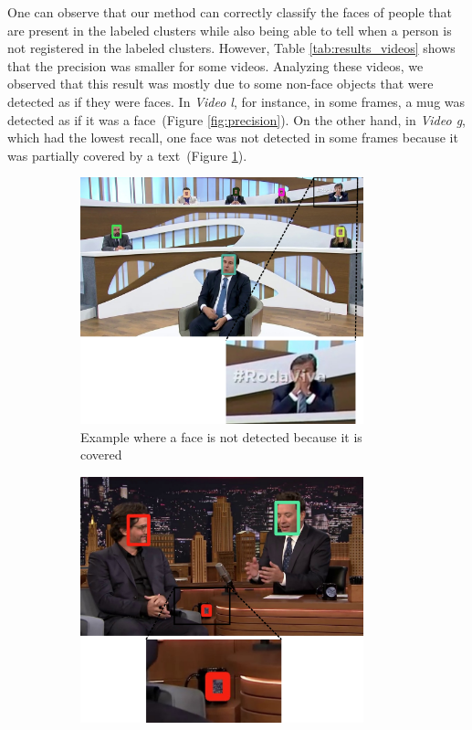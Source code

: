One can observe that our method can correctly classify the faces of people that are present in the labeled clusters while also being able to tell when a person is not registered in the labeled clusters.
However, Table \ref{tab:results_videos} shows that the precision was smaller for some videos. Analyzing these videos, we observed that this result was mostly due to some non-face objects that were detected as if they were faces.
In \emph{Video l}, for instance, in some frames, a mug was detected as if it was a face~(Figure \ref{fig:precision}). 
On the other hand, in \emph{Video g}, which had the lowest recall, one face was not detected in some frames because it was partially covered by a text~(Figure \ref{fig:recall}).

\begin{figure}[!ht]
\centering
    \begin{subfigure}{0.47\linewidth}
        \centering
        \includegraphics[width=0.9\textwidth]{img/face_recognition/maia2.png}
        \caption{Example where a face is not detected because it is covered}
        \label{fig:recall}
    \end{subfigure}\hfill
    \begin{subfigure}{0.47\linewidth}
        \centering
        \includegraphics[width=0.9\textwidth]{img/face_recognition/wagner2.png}

\end{subfigure}
\end{figure}
